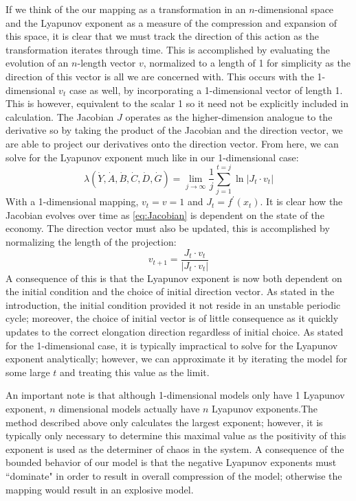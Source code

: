 If we think of the our mapping as a transformation in an $n$-dimensional space and the Lyapunov exponent as a measure of the compression and expansion of this space, it is clear that we must track the direction of this action as the transformation iterates through time. This is accomplished by evaluating the evolution of an $n$-length vector $v$, normalized to a length of 1 for simplicity as the direction of this vector is all we are concerned with. This occurs with the 1-dimensional $v_t$ case as well, by incorporating a 1-dimensional vector of length 1. This is however, equivalent to the scalar 1 so it need not be explicitly included in calculation. The Jacobian $J$ operates as the higher-dimension analogue to the derivative so by taking the product of the Jacobian and the direction vector, we are able to project our derivatives onto the direction vector. From here, we can solve for the Lyapunov exponent much like in our 1-dimensional case:
\begin{equation}
    \lambda(\dot Y,\dot A,\dot B,\dot C,\dot D,\dot G)= \lim_{j\to\infty}\frac{1}{j}\sum^{t=j}_{j=1}\ln\lvert J_t\cdot v_t\rvert
\end{equation}
With a 1-dimensional mapping, $v_t=v=1$ and $J_t=f^\prime(x_t)$. It is clear how the Jacobian evolves over time as \ref{eq:Jacobian} is dependent on the state of the economy. The direction vector must also be updated, this is accomplished by normalizing the length of the projection:
\begin{equation}
    v_{t+1}=\frac{J_t\cdot v_t}{\lvert J_t\cdot v_t\rvert}
\end{equation}
A consequence of this is that the Lyapunov exponent is now both dependent on the initial condition and the choice of initial direction vector\autocite{MedioAlfredo2001Ndap,Puu2003}. As stated in the introduction, the initial condition provided it not reside in an unstable periodic cycle; moreover, the choice of initial vector is of little consequence as it quickly updates to the correct elongation direction regardless of initial choice. As stated for the 1-dimensional case, it is typically impractical to solve for the Lyapunov exponent analytically; however, we can approximate it by iterating the model for some large $t$ and treating this value as the limit.

An important note is that although 1-dimensional models only have 1 Lyapunov exponent, $n$ dimensional models actually have $n$ Lyapunov exponents.The method described above only calculates the largest exponent; however, it is typically only necessary to determine this maximal value as the positivity of this exponent is used as the determiner of chaos in the system. A consequence of the bounded behavior of our model is that the negative Lyapunov exponents must ``dominate" in order to result in overall compression of the model; otherwise the mapping would result in an explosive model. 

